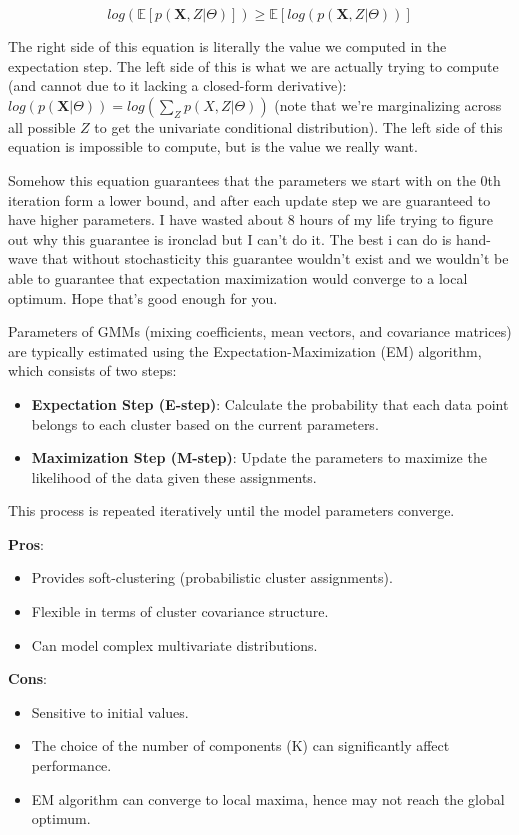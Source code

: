 \documentclass[12pt]{article}
\begin{document}
\[ log(\mathbb{E}[p(\mathbf{X}, Z | \Theta)]) \geq \mathbb{E}[log(p(\mathbf{X}, Z | \Theta))]\]

The right side of this equation is literally the value we computed in the expectation step. The left side of this is what we are actually trying to compute (and cannot due to it lacking a closed-form derivative): \(log(p(\mathbf{X} | \Theta)) = log\left(\sum_Z p(X, Z | \Theta)\right)\) (note that we're marginalizing across all possible \(Z\) to get the univariate conditional distribution). The left side of this equation is impossible to compute, but is the value we really want.

Somehow this equation guarantees that the parameters we start with on the 0th iteration form a lower bound, and after each update step we are guaranteed to have higher parameters. I have wasted about 8 hours of my life trying to figure out why this guarantee is ironclad but I can't do it. The best i can do is hand-wave that without stochasticity this guarantee wouldn't exist and we wouldn't be able to guarantee that expectation maximization would converge to a local optimum. Hope that's good enough for you.



Parameters of GMMs (mixing coefficients, mean vectors, and covariance matrices) are typically estimated using the Expectation-Maximization (EM) algorithm, which consists of two steps:
\begin{itemize}
    \item \textbf{Expectation Step (E-step)}: Calculate the probability that each data point belongs to each cluster based on the current parameters.
    \item \textbf{Maximization Step (M-step)}: Update the parameters to maximize the likelihood of the data given these assignments.
\end{itemize}
This process is repeated iteratively until the model parameters converge.


\textbf{Pros}:
\begin{itemize}
    \item Provides soft-clustering (probabilistic cluster assignments).
    \item Flexible in terms of cluster covariance structure.
    \item Can model complex multivariate distributions.
\end{itemize}

\textbf{Cons}:
\begin{itemize}
    \item Sensitive to initial values.
    \item The choice of the number of components (K) can significantly affect performance.
    \item EM algorithm can converge to local maxima, hence may not reach the global optimum.
\end{itemize}
\end{document}
